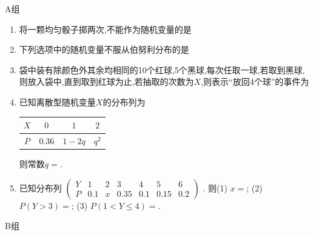A组
\begin{enumerate}
\item 将一颗均匀骰子掷两次,不能作为随机变量的是

\item 下列选项中的随机变量不服从伯努利分布的是

\item 袋中装有除颜色外其余均相同的10个红球,5个黑球,每次任取一球,若取到黑球,则放入袋中,直到取到红球为止,若抽取的次数为$X$,则表示“放回4个球”的事件为

\item 已知离散型随机变量$X$的分布列为
\begin{center}
\begin{tabular}{|c|c|c|c|}
\hline
$X$ & $0$ & $1$ & $2$ \\
\hline
$P$ & $0.36$ & $1-2q$ & $q^2$ \\
\hline
\end{tabular}
\end{center}
则常数$q=$.

\item 已知分布列 $\begin{pmatrix}Y&1&2&3&4&5&6\\ P&0.1&x&0.35&0.1&0.15&0.2\end{pmatrix}$ . 则(1) $x=$; (2) $P(Y>3)=$; (3) $P(1<Y\le 4)=$.
\end{enumerate}
 
B组


